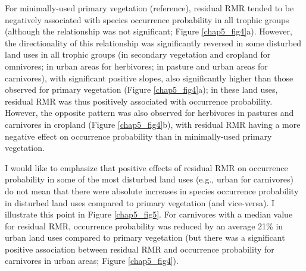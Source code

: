 \clearpage

For minimally-used primary vegetation (reference), residual RMR tended to be negatively associated with species occurrence probability in all trophic groups (although the relationship was not significant; Figure \ref{chap5_fig4}a). However, the directionality of this relationship was significantly reversed in some disturbed land uses in all trophic groups (in secondary vegetation and cropland for omnivores; in urban areas for herbivores; in pasture and urban areas for carnivores), with significant positive slopes, also significantly higher than those observed for primary vegetation (Figure \ref{chap5_fig4}a); in these land uses, residual RMR was thus positively associated with occurrence probability. However, the opposite pattern was also observed for herbivores in pastures and carnivores in cropland (Figure \ref{chap5_fig4}b), with residual RMR having a more negative effect on occurrence probability than in minimally-used primary vegetation.

I would like to emphasize that positive effects of residual RMR on occurrence probability in some of the most disturbed land uses (e.g., urban for carnivores) do not mean that there were absolute increases in species occurrence probability in disturbed land uses compared to primary vegetation (and vice-versa). I illustrate this point in Figure \ref{chap5_fig5}. For carnivores with a median value for residual RMR, occurrence probability was reduced by an average 21\% in urban land uses compared to primary vegetation (but there was a significant positive association between residual RMR and occurrence probability for carnivores in urban areas; Figure \ref{chap5_fig4}). 

